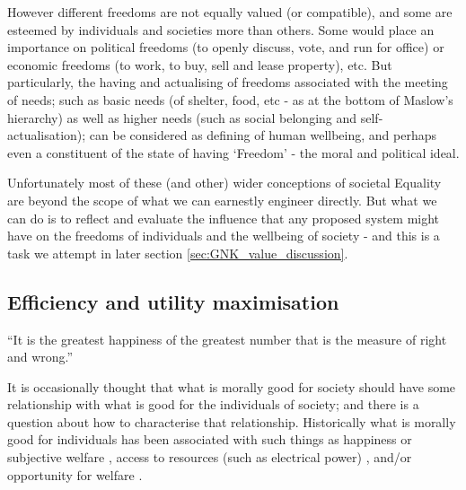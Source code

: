 However different freedoms are not equally valued (or compatible), and some are esteemed by individuals and societies more than others.
Some would place an importance on political freedoms (to openly discuss, vote, and run for office) or economic freedoms (to work, to buy, sell and lease property), etc. %
But particularly, the having and actualising of freedoms associated with the meeting of needs; such as basic needs (of shelter, food, etc - as at the bottom of Maslow's hierarchy) as well as higher needs (such as social belonging and self-actualisation); can be considered as defining of human wellbeing, and perhaps even a constituent of the state of having `Freedom' - the moral and political ideal.

Unfortunately most of these (and other) wider conceptions of societal Equality are beyond the scope of what we can earnestly engineer directly. But what we can do is to reflect and evaluate the influence that any proposed system might have on the freedoms of individuals and the wellbeing of society - and this is a task we attempt in later section \ref{sec:GNK_value_discussion}.

\subsection{Efficiency and utility maximisation}\label{sec:philosophy_efficiency}


\begin{displayquote}``It is the greatest happiness of the greatest number that is the measure of right and wrong.'' \citep{bentham2001fragment}
\end{displayquote} 

It is occasionally thought that what is morally good for society should have some relationship with what is good for the individuals of society; and there is a question about how to characterise that relationship.
Historically what is morally good for individuals has been associated with such things as happiness \citep{burns2005happiness} or subjective welfare \citep{10.2307/2264894}, access to resources (such as electrical power) \citep{10.2307/2265047}, and/or opportunity for welfare \citep{10.2307/4320203}.%

